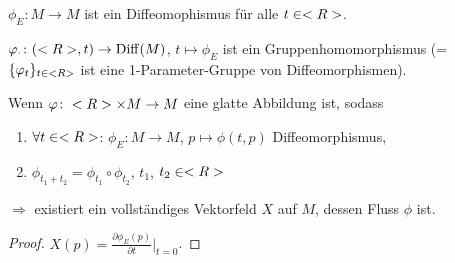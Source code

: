 \begin{conclusion}
	$\phi_E\colon M\to M$ ist ein Diffeomophismus für alle $t\in <R>$.
\end{conclusion}

\begin{conclusion}
	$\varphi_\cdot\colon (<R>,t)\to \mathrm{Diff}(M)$, $t\mapsto \phi_E$ ist ein Gruppenhomomorphismus (=$\{\varphi_t\}_{t\in<R>}$ ist eine 1-Parameter-Gruppe von Diffeomorphismen).
\end{conclusion}

\begin{lemma}
	Wenn $\varphi\colon <R>\times M\to M$ eine glatte Abbildung ist, sodass \begin{enumerate}[label={\arabic*)}]
		\item $\forall t\in <R>$: $\phi_E\colon M\to M$, $p\mapsto \phi(t,p)$ Diffeomorphismus,
		\item $\phi_{t_1+t_2} = \phi_{t_1}\circ\phi_{t_2}$, $t_1$, $t_2\in<R>$
	\end{enumerate}
	\hspace*{0.5em}$\Rightarrow$ existiert ein vollständiges Vektorfeld $X$ auf $M$, dessen Fluss $\phi$ ist.
\end{lemma}

\begin{proof}
	$X(p) = \frac{\partial \phi_E(p)}{\partial t}\Big|_{t=0}$.
\end{proof}